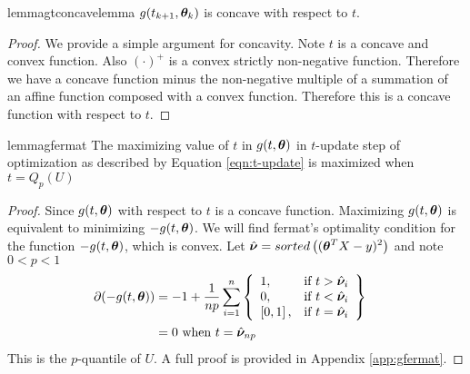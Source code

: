 \documentclass{article} %
\begin{document}
	\begin{restatable}{lemma}{gtconcavelemma}
		\label{lem:gtcomcavelemma}
		$g(t_{k+1},{\bm{\theta}}_k)$ is concave with respect to $t$.
	\end{restatable}
	\begin{proof}
		We provide a simple argument for concavity. Note $t$ is a concave and convex function. Also $(\cdot)^+$ is a convex strictly non-negative function. Therefore we have a concave function minus the non-negative multiple of a summation of an affine function composed with a convex function. Therefore this is a concave function with respect to $t$. 
	\end{proof}	
	
	\begin{restatable}{lemma}{gfermat}
		\label{lem:gfermat}
		The maximizing value of $t$ in $g(t,{\bm{\theta}})$ in $t$-update step of optimization as described by Equation \ref{eqn:t-update} is maximized when $t = Q_p(U)$
	\end{restatable}
		\begin{proof}
		Since $\displaystyle g(t,{\bm{\theta}})$ with respect to $t$ is a concave function. Maximizing $g(t,{\bm{\theta}})$ is equivalent to minimizing $-g(t,{\bm{\theta}})$. We will find fermat's optimality condition for the function $\displaystyle -g(t,{\bm{\theta}})$, which is convex. 
		Let $\displaystyle \hat{{\bm{\nu}}} = sorted\left(({\bm{\theta}}^T X - y)^2\right)$ and note $\displaystyle 0 < p < 1$
		\begin{align}
			\partial{\displaystyle (-g(t,\boldsymbol{\theta}})) 
			&= -1 + \frac{1}{np}\sum_{i=1}^{n}
			\left\{
			\begin{array}{lr}
				1, & \text{if } t > \hat{{\bm{\nu}}}_i\\
				0, & \text{if } t < \hat{{\bm{\nu}}}_i \\
				\left[0,1\right], & \text{if } t = \hat{{\bm{\nu}}}_i \\
			\end{array}
			\right\}&&\\
			&= 0 \text{ when }\displaystyle t = \hat{{\bm{\nu}}}_{np}&&
		\end{align}
		This is the $p$-quantile of $U$. A full proof is provided in Appendix \ref{app:gfermat}.
	\end{proof}
	
\end{document}
